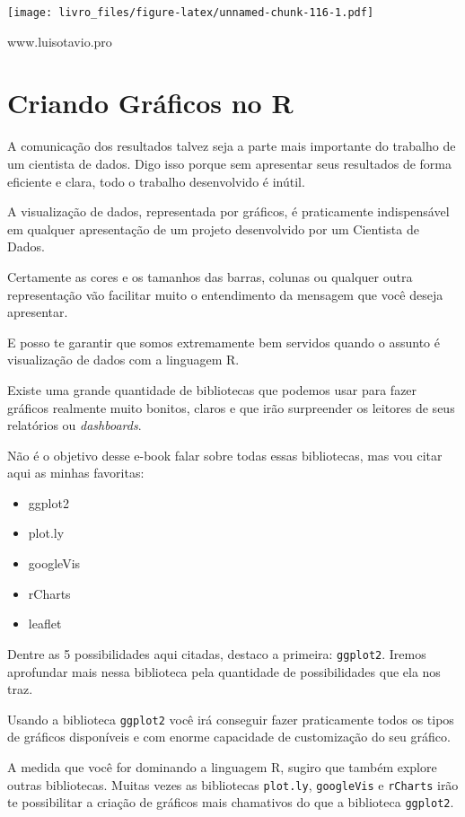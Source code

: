 \documentclass[
]{book}
\providecommand{\tightlist}{%
  \setlength{\itemsep}{0pt}\setlength{\parskip}{0pt}}
\begin{document}
\texttt{[image: livro\_files/figure-latex/unnamed-chunk-116-1.pdf]}

www.luisotavio.pro

\hypertarget{criando-gruxe1ficos-no-r}{%
\chapter{Criando Gráficos no R}\label{criando-gruxe1ficos-no-r}}

A comunicação dos resultados talvez seja a parte mais importante do
trabalho de um cientista de dados. Digo isso porque sem apresentar seus
resultados de forma eficiente e clara, todo o trabalho desenvolvido é
inútil.

A visualização de dados, representada por gráficos, é praticamente
indispensável em qualquer apresentação de um projeto desenvolvido por um
Cientista de Dados.

Certamente as cores e os tamanhos das barras, colunas ou qualquer outra
representação vão facilitar muito o entendimento da mensagem que você
deseja apresentar.

E posso te garantir que somos extremamente bem servidos quando o assunto
é visualização de dados com a linguagem R.

Existe uma grande quantidade de bibliotecas que podemos usar para fazer
gráficos realmente muito bonitos, claros e que irão surpreender os
leitores de seus relatórios ou \emph{dashboards}.

Não é o objetivo desse e-book falar sobre todas essas bibliotecas, mas
vou citar aqui as minhas favoritas:

\begin{itemize}
\tightlist
\item
  ggplot2
\item
  plot.ly
\item
  googleVis
\item
  rCharts
\item
  leaflet
\end{itemize}

Dentre as 5 possibilidades aqui citadas, destaco a primeira:
\texttt{ggplot2}. Iremos aprofundar mais nessa biblioteca pela
quantidade de possibilidades que ela nos traz.

Usando a biblioteca \texttt{ggplot2} você irá conseguir fazer
praticamente todos os tipos de gráficos disponíveis e com enorme
capacidade de customização do seu gráfico.

A medida que você for dominando a linguagem R, sugiro que também explore
outras bibliotecas. Muitas vezes as bibliotecas \texttt{plot.ly},
\texttt{googleVis} e \texttt{rCharts} irão te possibilitar a criação de
gráficos mais chamativos do que a biblioteca \texttt{ggplot2}.
\end{document}
